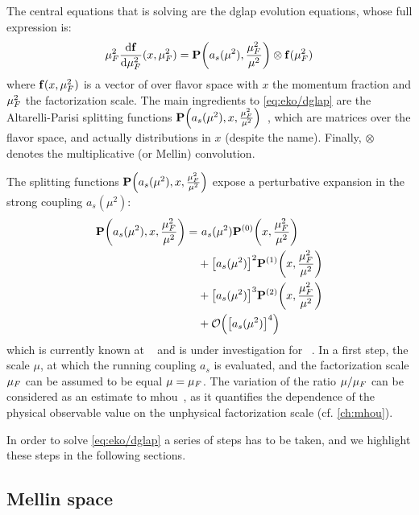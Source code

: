 
The central equations that \eko is solving are the \acrfull{dglap} evolution
equations, whose full expression is:
\begin{equation}
  \muF^2 \dv{\vb f}{\muF^2}{}(x,\muF^2) = \vb P\qty(a_s(\mu^2),\frac{\muF^2}{\mu^2}) \otimes \vb f(\muF^2)
	\label{eq:eko/dglap}
\end{equation}
where $\vb f(x,\mu_F^2)$ is a vector of \pdfs over flavor space with $x$ the
momentum fraction and $\mu_F^2$ the factorization scale. The main ingredients to
\cref{eq:eko/dglap} are the Altarelli-Parisi splitting functions $\vb
P\qty(a_s(\mu^2),x,\frac{\mu_F^2}{\mu^2})$~\cite{Moch:2004pa,Vogt:2004mw}, which
are matrices over the flavor space, and actually distributions in $x$ (despite
the name).
Finally, $\otimes$ denotes the multiplicative (or Mellin) convolution.

The splitting functions $\vb P\qty(a_s(\mu^2),x,\frac{\mu_F^2}{\mu^2})$ expose a
perturbative expansion in the strong coupling $a_s(\mu^2)$:
\begin{align}
  \vb P\qty(a_s(\mu^2),x,\frac{\muF^2}{\mu^2}) =
  &~ a_s(\mu^2) \vb P^{(0)}\qty(x,\frac{\muF^2}{\mu^2})\nonumber\\
  &+ \qty[a_s(\mu^2)]^2 \vb P^{(1)}\qty(x,\frac{\muF^2}{\mu^2})\nonumber\\
  &+ \qty[a_s(\mu^2)]^3 \vb P^{(2)}\qty(x,\frac{\muF^2}{\mu^2})\nonumber\\
  &+ \order{\qty[a_s(\mu^2)]^4}
\end{align}
which is currently known at \nnlo{}~\cite{Moch:2004pa,Vogt:2004mw,Blumlein:2021enk} and is under
investigation for \nnnlo{}~\cite{Moch:2021qrk}.
In a first step, the scale $\mu$, at which the running coupling $a_s$ is
evaluated, and the factorization scale $\mu_F$ can be assumed to be equal $\mu =
\mu_F$.
The variation of the ratio $\mu/\mu_F$ can be considered as an estimate to
\acrfull{mhou}~\cite{AbdulKhalek:2019ihb}, as it quantifies the dependence of
the physical observable value on the unphysical factorization scale (cf.
\cref{ch:mhou}).

In order to solve \cref{eq:eko/dglap} a series of steps has to be taken, and we
highlight these steps in the following sections.

\subsection{Mellin space}
\label{sec:eko/theory-mellin}


